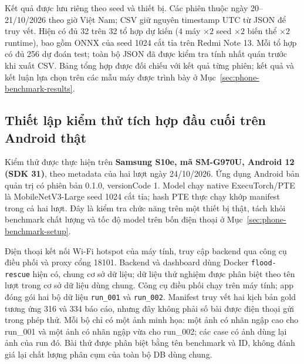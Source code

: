 Kết quả được lưu riêng theo seed và thiết bị. Các phiên thuộc ngày 20--21/10/2026 theo giờ Việt Nam; CSV giữ nguyên timestamp UTC từ JSON để truy vết. Hiện có đủ 32 trên 32 tổ hợp dự kiến ($4$ máy $\times 2$ seed $\times 2$ biến thể $\times 2$ runtime), bao gồm ONNX của seed 1024 cắt tỉa trên Redmi Note 13. Mỗi tổ hợp có đủ 256 dự đoán test; toàn bộ JSON đã được kiểm tra tính nhất quán trước khi xuất CSV. Bảng tổng hợp được đối chiếu với kết quả từng phiên; kết quả và kết luận lựa chọn trên các mẫu máy được trình bày ở Mục~\ref{sec:phone-benchmark-results}.

\subsection{Thiết lập kiểm thử tích hợp đầu cuối trên Android thật}\label{sec:mobile-system-setup}
Kiểm thử được thực hiện trên \textbf{Samsung S10e, mã SM-G970U, Android 12 (SDK 31)}, theo metadata của hai lượt ngày 24/10/2026. Ứng dụng Android bản quản trị có phiên bản 0.1.0, versionCode 1. Model chạy native ExecuTorch/PTE là MobileNetV3-Large seed 1024 cắt tỉa; hash PTE thực chạy khớp manifest trong cả hai lượt. Đây là kiểm tra chức năng trên một thiết bị thật, tách khỏi benchmark chất lượng và tốc độ model trên bốn điện thoại ở Mục~\ref{sec:phone-benchmark-setup}.

Điện thoại kết nối Wi-Fi hotspot của máy tính, truy cập backend qua công cụ điều phối và proxy cổng 18101. Backend và dashboard dùng Docker \texttt{flood-rescue} hiện có, chung cơ sở dữ liệu; dữ liệu thử nghiệm được phân biệt theo tên lượt trong cơ sở dữ liệu dùng chung. Công cụ điều phối chạy trên máy tính; app đóng gói hai bộ dữ liệu \texttt{run\_001} và \texttt{run\_002}. Manifest truy vết hai kịch bản gold tương ứng 316 và 334 báo cáo, nhưng đây không phải số bài được điện thoại gửi trong phép thử. Mỗi bộ chỉ có một ảnh minh họa: một ảnh có nhãn ngập cao cho run\_001 và một ảnh có nhãn ngập vừa cho run\_002; các case có ảnh dùng lại ảnh của run đó. Bài thử được phân biệt bằng tên benchmark và ID, không đánh giá lại chất lượng phân cụm của toàn bộ DB dùng chung.

